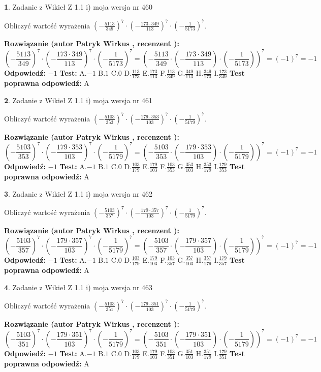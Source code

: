 \documentclass[12pt, a4paper]{article}
\theoremstyle{definition} %
\newtheorem{zad}{}
\newcommand{\zadStart}[1]{\begin{zad}#1\newline}
\newcommand{\zadStop}{\end{zad}}
\newcommand{\rozwStart}[2]{\noindent \textbf{Rozwiązanie (autor #1 , recenzent #2): }\newline}
\newcommand{\rozwStop}{\newline}
\newcommand{\odpStart}{\noindent \textbf{Odpowiedź:}\newline}
\newcommand{\odpStop}{\newline}
\newcommand{\testStart}{\noindent \textbf{Test:}\newline}
\newcommand{\testStop}{\newline}
\newcommand{\kluczStart}{\noindent \textbf{Test poprawna odpowiedź:}\newline}
\newcommand{\kluczStop}{\newline}
\begin{document}
\zadStart{Zadanie z Wikieł Z 1.1 i) moja wersja nr 460}

Obliczyć wartość wyrażenia $(-\frac{5113}{349})^{7} \cdot (-\frac{173 \cdot 349}{113})^{7} \cdot (-\frac{1}{5173})^{7}$.
\zadStop
\rozwStart{Patryk Wirkus}{}
$$(-\frac{5113}{349})^{7} \cdot (-\frac{173 \cdot 349}{113})^{7} \cdot (-\frac{1}{5173})^{7} = (-\frac{5113}{349} \cdot (-\frac{173 \cdot 349}{113}) \cdot (-\frac{1}{5173}))^{7} = (-1)^{7} = -1$$
\rozwStop
\odpStart
$-1$
\odpStop
\testStart
A.$-1$ B.$1$ C.$0$ D.$\frac{113}{173}$ E.$\frac{173}{113}$
F.$\frac{113}{349}$ G.$\frac{349}{113}$
H.$\frac{349}{173}$
I.$\frac{173}{349}$
\testStop
\kluczStart
A
\kluczStop



\zadStart{Zadanie z Wikieł Z 1.1 i) moja wersja nr 461}

Obliczyć wartość wyrażenia $(-\frac{5103}{353})^{7} \cdot (-\frac{179 \cdot 353}{103})^{7} \cdot (-\frac{1}{5179})^{7}$.
\zadStop
\rozwStart{Patryk Wirkus}{}
$$(-\frac{5103}{353})^{7} \cdot (-\frac{179 \cdot 353}{103})^{7} \cdot (-\frac{1}{5179})^{7} = (-\frac{5103}{353} \cdot (-\frac{179 \cdot 353}{103}) \cdot (-\frac{1}{5179}))^{7} = (-1)^{7} = -1$$
\rozwStop
\odpStart
$-1$
\odpStop
\testStart
A.$-1$ B.$1$ C.$0$ D.$\frac{103}{179}$ E.$\frac{179}{103}$
F.$\frac{103}{353}$ G.$\frac{353}{103}$
H.$\frac{353}{179}$
I.$\frac{179}{353}$
\testStop
\kluczStart
A
\kluczStop



\zadStart{Zadanie z Wikieł Z 1.1 i) moja wersja nr 462}

Obliczyć wartość wyrażenia $(-\frac{5103}{357})^{7} \cdot (-\frac{179 \cdot 357}{103})^{7} \cdot (-\frac{1}{5179})^{7}$.
\zadStop
\rozwStart{Patryk Wirkus}{}
$$(-\frac{5103}{357})^{7} \cdot (-\frac{179 \cdot 357}{103})^{7} \cdot (-\frac{1}{5179})^{7} = (-\frac{5103}{357} \cdot (-\frac{179 \cdot 357}{103}) \cdot (-\frac{1}{5179}))^{7} = (-1)^{7} = -1$$
\rozwStop
\odpStart
$-1$
\odpStop
\testStart
A.$-1$ B.$1$ C.$0$ D.$\frac{103}{179}$ E.$\frac{179}{103}$
F.$\frac{103}{357}$ G.$\frac{357}{103}$
H.$\frac{357}{179}$
I.$\frac{179}{357}$
\testStop
\kluczStart
A
\kluczStop



\zadStart{Zadanie z Wikieł Z 1.1 i) moja wersja nr 463}

Obliczyć wartość wyrażenia $(-\frac{5103}{351})^{7} \cdot (-\frac{179 \cdot 351}{103})^{7} \cdot (-\frac{1}{5179})^{7}$.
\zadStop
\rozwStart{Patryk Wirkus}{}
$$(-\frac{5103}{351})^{7} \cdot (-\frac{179 \cdot 351}{103})^{7} \cdot (-\frac{1}{5179})^{7} = (-\frac{5103}{351} \cdot (-\frac{179 \cdot 351}{103}) \cdot (-\frac{1}{5179}))^{7} = (-1)^{7} = -1$$
\rozwStop
\odpStart
$-1$
\odpStop
\testStart
A.$-1$ B.$1$ C.$0$ D.$\frac{103}{179}$ E.$\frac{179}{103}$
F.$\frac{103}{351}$ G.$\frac{351}{103}$
H.$\frac{351}{179}$
I.$\frac{179}{351}$
\testStop
\kluczStart
A
\kluczStop
\end{document}
